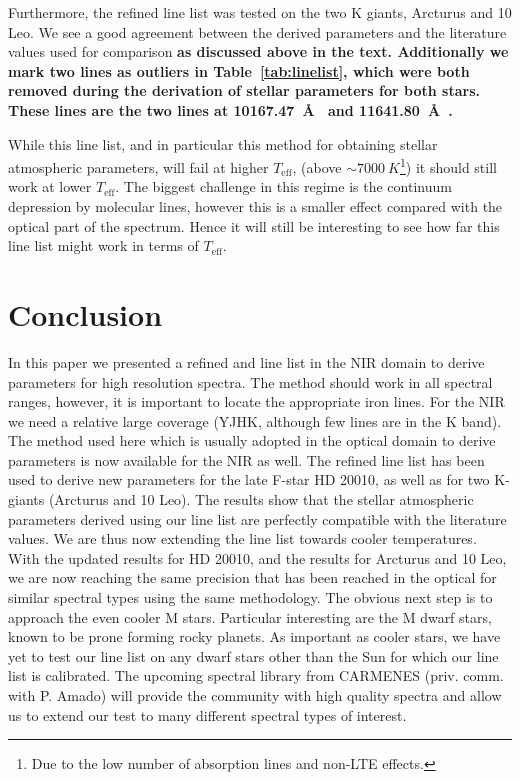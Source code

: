 \documentclass{aa}
\begin{document}
Furthermore, the refined line list was tested on the two K giants, Arcturus and 10 Leo. We see a
good agreement between the derived parameters and the literature values used for comparison {\bf as
discussed above in the text. Additionally we mark two lines as outliers in Table~\ref{tab:linelist},
which were both removed during the derivation of stellar parameters for both stars. These lines are
the two  lines at \SI{10167.47}{\AA{}} and \SI{11641.80}{\AA{}}.}

While this line list, and in particular this method for obtaining stellar
atmospheric parameters, will fail at higher $T_\mathrm{eff}$, (above
$\sim\SI{7000}{K}$\footnote{Due to the low number of absorption lines and
non-LTE effects.}) it should still work at lower $T_\mathrm{eff}$. The biggest
challenge in this regime is the continuum depression by molecular lines, however
this is a smaller effect compared with the optical part of the spectrum. Hence
it will still be interesting to see how far this line list might work in terms
of $T_\mathrm{eff}$.



\section{Conclusion}
\label{sec:conclusion}

In this paper we presented a refined  and  line list in
the NIR domain to derive parameters for high resolution spectra. The
method should work in all spectral ranges, however, it is important to locate
the appropriate iron lines. For the NIR we need a relative large coverage (YJHK,
although few lines are in the K band). The method used here which is usually
adopted in the optical domain to derive parameters is now available for the NIR
as well. The refined line list has been used to derive new parameters for the
late F-star HD 20010, as well as for two K-giants (Arcturus and 10 Leo). The
results show that the stellar atmospheric parameters derived using our line list
are perfectly compatible with the literature values. We are thus now extending
the line list towards cooler temperatures. With the updated results for HD
20010, and the results for Arcturus and 10 Leo, we are now reaching the same
precision that has been reached in the optical for similar spectral types using
the same methodology. The obvious next step is to approach the even cooler M
stars. Particular interesting are the M dwarf stars, known to be prone forming
rocky planets. As important as cooler stars, we have yet to test our line list
on any dwarf stars other than the Sun for which our line list is calibrated. The
upcoming spectral library from CARMENES (priv. comm. with P. Amado) will provide
the community with high quality spectra and allow us to extend our test to many
different spectral types of interest.
\end{document}
